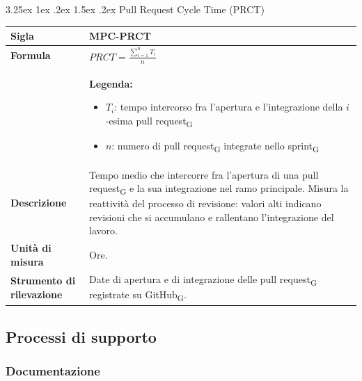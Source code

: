 \documentclass[a4paper, 10pt]{article}
\makeatletter
\renewcommand\paragraph{\@startsection{paragraph}{4}{\z@}%
  {3.25ex \@plus1ex \@minus .2ex}%
  {1.5ex \@plus .2ex}%
  {\normalfont\normalsize\bfseries}}
\makeatother
\begin{document}
\paragraph{Pull Request Cycle Time (PRCT)}
\mbox{} \\
\noindent
\begin{minipage}{\textwidth}
    \begin{tabularx}{\textwidth}{|>{\columncolor{bluBitless!10}\bfseries}p{3.5cm}|X|}
        \hline
        Sigla & MPC-PRCT \\ \hline
        Formula &
        \textit{$PRCT = \frac{\sum_{i=1}^{n} T_{i}}{n}$} \vspace{2mm} \\
        & \small \textbf{Legenda:}
        \begin{itemize}
            \item $T_{i}$: tempo intercorso fra l'apertura e l'integrazione della $i$-esima pull request\textsubscript{G}
            \item $n$: numero di pull request\textsubscript{G} integrate nello sprint\textsubscript{G}
        \end{itemize} \\ \hline
        Descrizione & Tempo medio che intercorre fra l'apertura di una pull request\textsubscript{G} e la sua integrazione nel ramo principale. Misura la reattività del processo di revisione: valori alti indicano revisioni che si accumulano e rallentano l'integrazione del lavoro. \\ \hline
        Unità di misura & Ore. \\ \hline
        Strumento di rilevazione & Date di apertura e di integrazione delle pull request\textsubscript{G} registrate su GitHub\textsubscript{G}. \\ \hline
    \end{tabularx}
\end{minipage}

\vspace{1cm}

\subsection{Processi di supporto}

\subsubsection{Documentazione}
\end{document}
